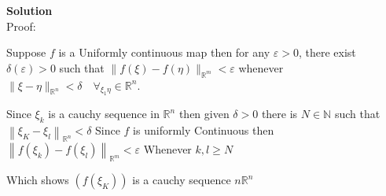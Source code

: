 \documentclass{article}
\begin{document}
\textbf{Solution}\\

Proof:

Suppose $f$ is a Uniformly continuous map then for any $\varepsilon>0$, 
there exist $\delta(\varepsilon)>0$ such that $\|f(\xi)-f(\eta)\|_{\mathbb{R}^{m}}<\varepsilon$ whenever $\|\xi-\eta\|_{\mathbb{R}^{n}}<\delta \quad \forall_{\xi_{1} \eta} \in \mathbb{R}^{n}$. 

Since $\xi_{k}$ is a cauchy sequence in $\mathbb{R}^{n}$ then given $\delta>0$ there is $N \in \mathbb{N}$ such that $\left\|\xi_{K}-\xi_{l}\right\|_{\mathbb{R}^{n}}<\delta$ Since $f$ is uniformly Continuous then $\left\|f\left(\xi_{k}\right)-f\left(\xi_{l}\right)\right\|_{\mathbb{R}^{m}}<\varepsilon$ Whenever $k, l \geq N$

Which shows $\left(f\left(\xi_{K}\right)\right)$ is a cauchy sequence $n \mathbb{R}^{n}$
\end{document}
